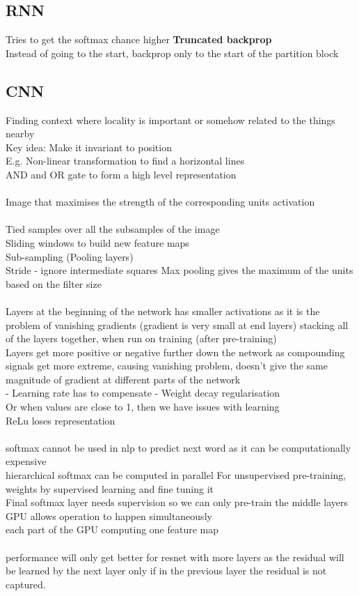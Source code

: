 \documentclass[11pt]{article}
\begin{document}
\subsection*{RNN}
Tries to get the softmax chance higher
\textbf{Truncated backprop}\\
Instead of going to the start, backprop only to the start of the partition block
\subsection*{CNN}
Finding context where locality is important or somehow related to the things nearby\\
Key idea: Make it invariant to position\\
E.g. Non-linear transformation to find a horizontal lines\\
AND and OR gate to form a high level representation\\
\\
Image that maximises the strength of the corresponding units activation\\
\\
Tied samples over all the subsamples of the image\\
Sliding windows to build new feature maps\\
Sub-sampling (Pooling layers)\\
Stride - ignore intermediate squares
Max pooling gives the maximum of the units based on the filter size\\
\\
Layers at the beginning of the network has smaller activations as it is the problem of vanishing gradients (gradient is very small at end layers) stacking all of the layers together, when run on training (after pre-training)
\\
Layers get more positive or negative further down the network as compounding signals get more extreme, causing vanishing problem, doesn't give the same magnitude of gradient at different parts of the network
\\
- Learning rate has to compensate
- Weight decay regularisation 
\\ 
Or when values are close to 1, then we have issues with learning
\\
ReLu loses representation \\
\\
softmax cannot be used in nlp to predict next word as it can be computationally expensive
\\
hierarchical softmax can be computed in parallel
For unsupervised pre-training, weights by supervised learning and fine tuning it
\\
Final softmax layer needs supervision so we can only pre-train the middle layers
\\
GPU allows operation to happen simultaneously\\
each part of the GPU computing one feature map
\\
\\
performance will only get better for resnet with more layers as the residual will be learned by the next layer only if in the previous layer the residual is not captured.
\end{document}
